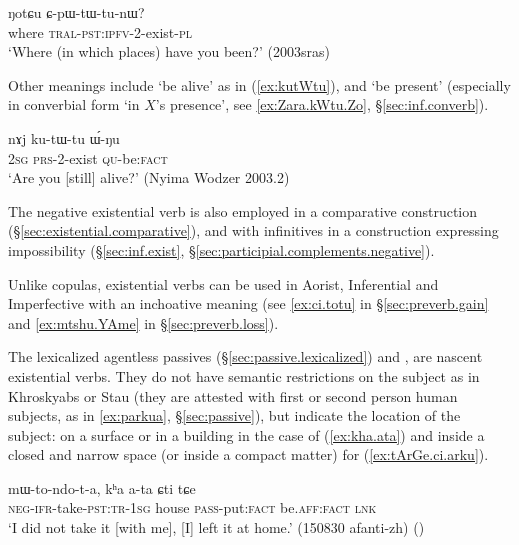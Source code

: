  \begin{exe}
\ex \label{ex:NotCu.CpWtWtunW}
\gll  ŋotɕu ɕ-pɯ-tɯ-tu-nɯ? \\
where \textsc{tral}-\textsc{pst}:\textsc{ipfv}-2-exist-\textsc{pl} \\
\glt `Where (in which places) have you been?' (2003sras)
\end{exe} 

Other meanings include `be alive' as in (\ref{ex:kutWtu}), and `be present' (especially in converbial form  `in $X$'s presence', see \ref{ex:Zara.kWtu.Zo}, §\ref{sec:inf.converb}). 

\begin{exe}
\ex \label{ex:kutWtu}
\gll  nɤj ku-tɯ-tu ɯ́-ŋu \\
\textsc{2sg} \textsc{prs}-2-exist \textsc{qu}-be:\textsc{fact} \\
\glt `Are you [still] alive?' (Nyima Wodzer 2003.2)
\end{exe} 

The negative existential verb  is also employed in a comparative construction (§\ref{sec:existential.comparative}), and with infinitives in a construction expressing impossibility (§\ref{sec:inf.exist}, §\ref{sec:participial.complements.negative}).

Unlike copulas, existential verbs can be used in Aorist, Inferential and Imperfective with an inchoative meaning (see  \ref{ex:ci.totu} in §\ref{sec:preverb.gain} and \ref{ex:mtshu.YAme} in §\ref{sec:preverb.loss}).
 
The lexicalized agentless passives (§\ref{sec:passive.lexicalized})   and , are nascent existential verbs. They do not have semantic restrictions on the subject as in Khroskyabs or Stau (they are attested with first or second person human subjects, as in \ref{ex:parkua}, §\ref{sec:passive}), but indicate the location of the subject: on a surface or in a building in the case of  (\ref{ex:kha.ata}) and inside a closed and narrow space (or inside a compact matter) for  (\ref{ex:tArGe.ci.arku}).
 
\begin{exe}
\ex \label{ex:kha.ata}
\gll  mɯ-to-ndo-t-a, kʰa a-ta ɕti tɕe \\
\textsc{neg}-\textsc{ifr}-take-\textsc{pst}:\textsc{tr}-\textsc{1sg} house \textsc{pass}-put:\textsc{fact} be.\textsc{aff}:\textsc{fact} \textsc{lnk} \\
\glt `I did not take it [with me], [I] left it at home.' (150830 afanti-zh)
()
 \end{exe}
  
